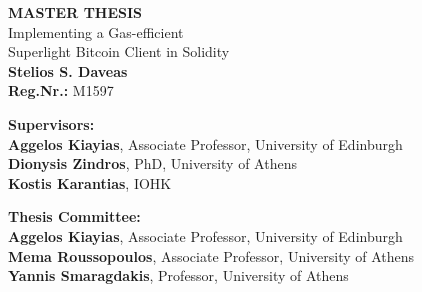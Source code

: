 \begin{center}
\begin{normalsize}
    \vspace{3cm}
    \textbf{MASTER THESIS}\\
    \vspace{3cm}
    Implementing a Gas-efficient\\
    Superlight Bitcoin Client in Solidity\\
    \vspace{3cm}
    \textbf{Stelios S. Daveas}\\
    \textbf{Reg.Nr.:} M1597

    \vspace{5cm}
    \begin{flushleft}
        \textbf{Supervisors:}\\
        \hspace{1.5cm}
        \textbf{Aggelos Kiayias}, Associate Professor, University of Edinburgh\\
        \hspace{1.5cm}
        \textbf{Dionysis Zindros}, PhD, University of Athens\\
        \hspace{1.5cm}
        \textbf{Kostis Karantias}, IOHK

        \vspace{1cm}

        \textbf{Thesis Committee:}\\
        \hspace{1.5cm}
        \textbf{Aggelos Kiayias}, Associate Professor, University of Edinburgh\\
        \hspace{1.5cm}
        \textbf{Mema Roussopoulos}, Associate Professor, University of Athens\\
        \hspace{1.5cm}
        \textbf{Yannis Smaragdakis}, Professor, University of Athens

    \end{flushleft}
\end{normalsize}
\end{center}
\pagebreak
